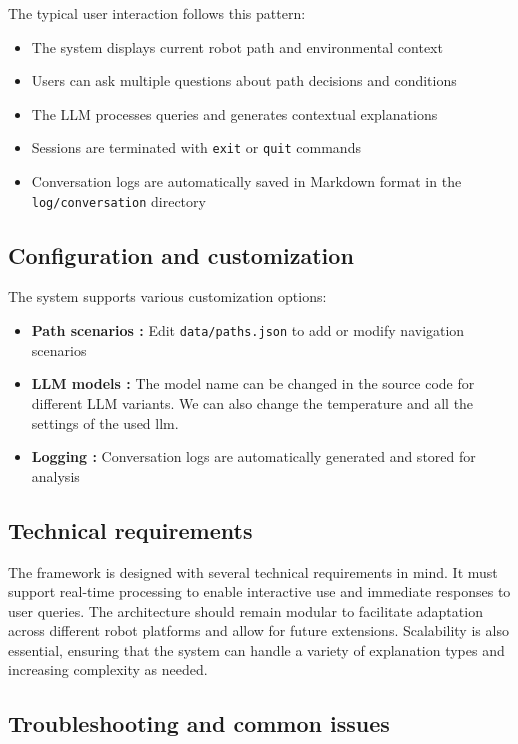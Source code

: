 The typical user interaction follows this pattern:
\begin{itemize}
    \item The system displays current robot path and environmental context
    \item Users can ask multiple questions about path decisions and conditions
    \item The LLM processes queries and generates contextual explanations
    \item Sessions are terminated with \texttt{exit} or \texttt{quit} commands
    \item Conversation logs are automatically saved in Markdown format in the \texttt{log/conversation} directory
\end{itemize}

\subsection{Configuration and customization}

The system supports various customization options:

\begin{itemize}
    \item \textbf{Path scenarios :} Edit \texttt{data/paths.json} to add or modify navigation scenarios
    \item \textbf{LLM models :} The model name can be changed in the source code for different LLM variants. We can also change the temperature and all the settings of the used llm.
    \item \textbf{Logging :} Conversation logs are automatically generated and stored for analysis
\end{itemize}

\subsection{Technical requirements}

The framework is designed with several technical requirements in mind.
It must support real-time processing to enable interactive use and immediate responses to user queries.
The architecture should remain modular to facilitate adaptation across different robot platforms and allow for future extensions.
Scalability is also essential, ensuring that the system can handle a variety of explanation types and increasing complexity as needed.

\subsection{Troubleshooting and common issues}

